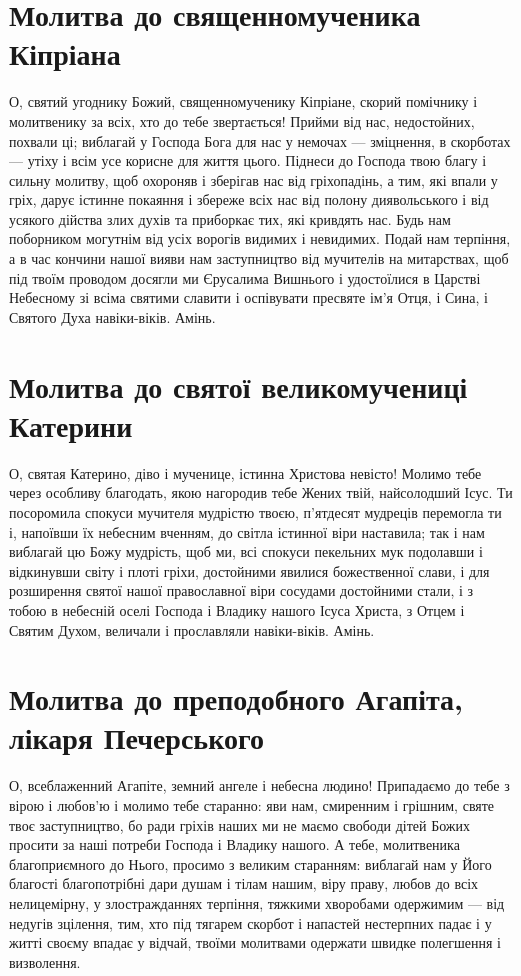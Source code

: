 \documentclass[chapters.tex]{subfiles}
\begin{document}
\section{Молитва до священномученика Кіпріана}
О, святий угоднику Божий, священномученику Кіпріане, скорий помічнику і молитвенику за всіх, хто до тебе звертається! Прийми від нас, недостойних, похвали ці; виблагай у Господа Бога для нас у немочах — зміцнення, в скорботах — утіху і всім усе корисне для життя цього. Піднеси до Господа твою благу і сильну молитву, щоб охороняв і зберігав нас від гріхопадінь, а тим, які впали у гріх, дарує істинне покаяння і збереже всіх нас від полону диявольського і від усякого дійства злих духів та приборкає тих, які кривдять нас. Будь нам поборником могутнім від усіх ворогів видимих і невидимих. Подай нам терпіння, а в час кончини нашої вияви нам заступництво від мучителів на митарствах, щоб під твоїм проводом досягли ми Єрусалима Вишнього і удостоїлися в Царстві Небесному зі всіма святими славити і оспівувати пресвяте ім’я Отця, і Сина, і Святого Духа навіки-віків. Амінь.

\section{Молитва до святої великомучениці Катерини}
О, святая Катерино, діво і мученице, істинна Христова невісто! Молимо тебе через особливу благодать, якою нагородив тебе Жених твій, найсолодший Ісус. Ти посоромила спокуси мучителя мудрістю твоєю, п’ятдесят мудреців перемогла ти і, напоївши їх небесним вченням, до світла істинної віри наставила; так і нам виблагай цю Божу мудрість, щоб ми, всі спокуси пекельних мук подолавши і відкинувши світу і плоті гріхи, достойними явилися божественної слави, і для розширення святої нашої православної віри сосудами достойними стали, і з тобою в небесній оселі Господа і Владику нашого Ісуса Христа, з Отцем і Святим Духом, величали і прославляли навіки-віків. Амінь.

\section{Молитва до преподобного Агапіта, лікаря Печерського}
О, всеблаженний Агапіте, земний ангеле і небесна людино! Припадаємо до тебе з вірою і любов’ю і молимо тебе старанно: яви нам, смиренним і грішним, святе твоє заступництво, бо ради гріхів наших ми не маємо свободи дітей Божих просити за наші потреби Господа і Владику нашого. А тебе, молитвеника благоприємного до Нього, просимо з великим старанням: виблагай нам у Його благості благопотрібні дари душам і тілам нашим, віру праву, любов до всіх нелицемірну, у злостражданнях терпіння, тяжкими хворобами одержимим — від недугів зцілення, тим, хто під тягарем скорбот і напастей нестерпних падає і у житті своєму впадає у відчай, твоїми молитвами одержати швидке полегшення і визволення.
\end{document}
